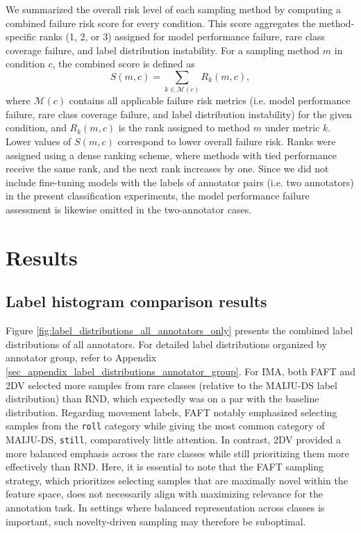\documentclass[a4paper,fleqn]{cas-dc}
\begin{document}
We summarized the overall risk level of each sampling method by computing a combined failure risk score for every condition. This score aggregates the method-specific ranks (1, 2, or 3) assigned for model performance failure, rare class coverage failure, and label distribution instability. For a sampling method $m$ in condition $c$, the combined score is defined as
\begin{equation}
    S(m, c) = \sum_{k \in \mathcal{M}(c)} R_k(m, c),
\end{equation}
where $\mathcal{M}(c)$ contains all applicable failure risk metrics (i.e. model performance failure, rare class coverage failure, and label distribution instability) for the given condition, and $R_k(m, c)$ is the rank assigned to method $m$ under metric $k$. Lower values of $S(m, c)$ correspond to lower overall failure risk. Ranks were assigned using a dense ranking scheme, where methods with tied performance receive the same rank, and the next rank increases by one. Since we did not include fine-tuning models with the labels of annotator pairs (i.e. two annotators) in the present classification experiments, the model performance failure assessment is likewise omitted in the two-annotator cases.


\section{Results} \label{sec_results}

\subsection{Label histogram comparison results} \label{subsec_label_histogram_comparison_results}

Figure \ref{fig:label_distributions_all_annotators_only} presents the combined label distributions of all annotators. For detailed label distributions organized by annotator group, refer to Appendix \ref{sec_appendix_label_distributions_annotator_group}. For IMA, both FAFT and 2DV selected more samples from rare classes (relative to the MAIJU-DS label distribution) than RND, which expectedly was on a par with the baseline distribution. Regarding movement labels, FAFT notably emphasized selecting samples from the \texttt{roll} category while giving the most common category of MAIJU-DS, \texttt{still}, comparatively little attention. In contrast, 2DV provided a more balanced emphasis across the rare classes while still prioritizing them more effectively than RND. Here, it is essential to note that the FAFT sampling strategy, which prioritizes selecting samples that are maximally novel within the feature space, does not necessarily align with maximizing relevance for the annotation task. In settings where balanced representation across classes is important, such novelty‑driven sampling may therefore be suboptimal.
\end{document}
